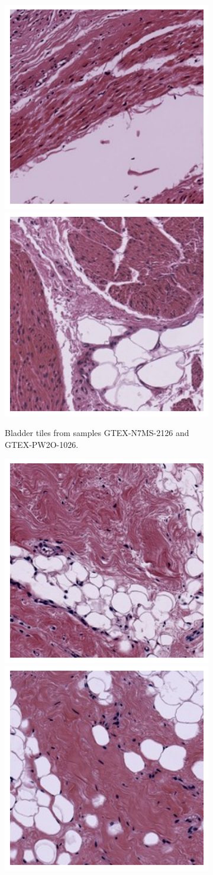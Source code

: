\documentclass{l4proj}
\begin{document}
\begin{appendices}
\begin{figure}
    \centering
    \begin{subfigure}[b]{\textwidth}
        \includegraphics[width=0.45\linewidth]{images/bladder1_1s.png}
        \includegraphics[width=0.45\linewidth]{images/bladder2_1s.png}
        \caption{Bladder tiles from samples GTEX-N7MS-2126 and GTEX-PW2O-1026.}
        \label{fig:leiden1_bladder}
        \vspace{1in}
    \end{subfigure}
    \begin{subfigure}[b]{\textwidth}
        \includegraphics[width=0.45\linewidth]{images/breast1_1s.png}
        \includegraphics[width=0.45\linewidth]{images/breast2_1s.png}

\end{subfigure}
\end{figure}
\end{appendices}
\end{document}
